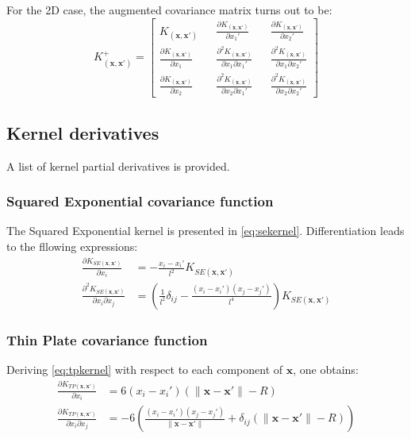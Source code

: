 \documentclass[10pt,a4paper,twocolumn]{article}
\begin{document}
For the 2D case, the augmented covariance matrix turns out to be:
\begin{equation}\label{eq:augm2Dkernel}
	K^+_{(\mathbf{x}, \mathbf{x'})} =
	\begin{bmatrix}
		K_{(\mathbf{x}, \mathbf{x'})} && \frac{\partial K_{(\mathbf{x}, \mathbf{x'})}}{\partial x_1'} && \frac{\partial K_{(\mathbf{x}, \mathbf{x'})}}{\partial x_2'} \\
		\frac{\partial K_{(\mathbf{x}, \mathbf{x'})}}{\partial x_1} && \frac{\partial^2 K_{(\mathbf{x}, \mathbf{x'})}}{\partial x_1 \partial x_1'} && \frac{\partial^2 K_{(\mathbf{x}, \mathbf{x'})}}{\partial x_1 \partial x_2'} \\
		\frac{\partial K_{(\mathbf{x}, \mathbf{x'})}}{\partial x_2} && \frac{\partial^2 K_{(\mathbf{x}, \mathbf{x'})}}{\partial x_2 \partial x_1'} && \frac{\partial^2 K_{(\mathbf{x}, \mathbf{x'})}}{\partial x_2 \partial x_2'}
	\end{bmatrix}
\end{equation}
\subsection{Kernel derivatives}
A list of kernel partial derivatives is provided.
\subsubsection{Squared Exponential covariance function}
The Squared Exponential kernel is presented in \autoref{eq:sekernel}. Differentiation leads to the fllowing expressions:
\begin{align}
	\frac{\partial K_{SE(\mathbf{x}, \mathbf{x'})}}{\partial x_i} &= -\frac{x_i - x_i'}{l^2} K_{SE(\mathbf{x}, \mathbf{x'})} \\
	\frac{\partial^2 K_{SE(\mathbf{x}, \mathbf{x'})}}{\partial x_i \partial x_j} &= \left( \frac{1}{l^2} \delta_{ij} - \frac{(x_i - x_i')(x_j - x_j')}{l^4} \right) K_{SE(\mathbf{x}, \mathbf{x'})}
\end{align}

\subsubsection{Thin Plate covariance function}
Deriving \autoref{eq:tpkernel} with respect to each component of $\mathbf{x}$, one obtains:
\small
\begin{align}
	\frac{\partial K_{TP(\mathbf{x}, \mathbf{x'})}}{\partial x_i} &= 6(x_i - x_i') \left( \|\mathbf{x} - \mathbf{x'}\| - R \right) \\
	\frac{\partial K_{TP(\mathbf{x}, \mathbf{x'})}}{\partial x_i \partial x_j} &= -6 \left( \frac{(x_i - x_i')(x_j - x_j')}{\|\mathbf{x} - \mathbf{x'}\|} + \delta_{ij}(\|\mathbf{x} - \mathbf{x'}\| - R) \right)
\end{align}
\normalsize
\end{document}
